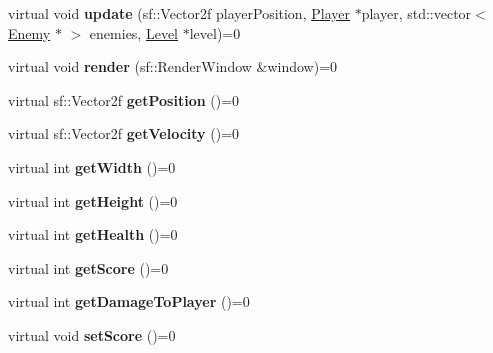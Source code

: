 \begin{DoxyCompactItemize}
\item 
\mbox{\label{class_enemy_a818f5fe2643b93a5b7783bcfe9d7b9e7}} 
virtual void {\bfseries update} (sf\+::\+Vector2f player\+Position, \mbox{\hyperlink{class_player}{Player}} $\ast$player, std\+::vector$<$ \mbox{\hyperlink{class_enemy}{Enemy}} $\ast$ $>$ enemies, \mbox{\hyperlink{class_level}{Level}} $\ast$level)=0
\item 
\mbox{\label{class_enemy_a508e8b1cd14172468ddda3c10f4677fb}} 
virtual void {\bfseries render} (sf\+::\+Render\+Window \&window)=0
\item 
\mbox{\label{class_enemy_a4777593b745b8d646fdacd75e1ff9290}} 
virtual sf\+::\+Vector2f {\bfseries get\+Position} ()=0
\item 
\mbox{\label{class_enemy_ad1c7a22b7222fa8e3ff7bf7865609530}} 
virtual sf\+::\+Vector2f {\bfseries get\+Velocity} ()=0
\item 
\mbox{\label{class_enemy_a3b749988c459091ba4e9601b76ad0d40}} 
virtual int {\bfseries get\+Width} ()=0
\item 
\mbox{\label{class_enemy_a21cc291f7d795ed09bc6816fdf83db87}} 
virtual int {\bfseries get\+Height} ()=0
\item 
\mbox{\label{class_enemy_a3842e497b75a3aed0fbd3b17be2321f3}} 
virtual int {\bfseries get\+Health} ()=0
\item 
\mbox{\label{class_enemy_a46e1688cc774d765515f03ec298e24ed}} 
virtual int {\bfseries get\+Score} ()=0
\item 
\mbox{\label{class_enemy_af80e66660d8e3f4c7dd8d10d459cc405}} 
virtual int {\bfseries get\+Damage\+To\+Player} ()=0
\item 
\mbox{\label{class_enemy_a7050e9299bdd7fe1fbe40dac587a2f1d}} 
virtual void {\bfseries set\+Score} ()=0
\item 
\mbox{\label{class_enemy_a91cdbf8f4aec8ce81c79d61f0d1037f7}} 

\end{DoxyCompactItemize}

